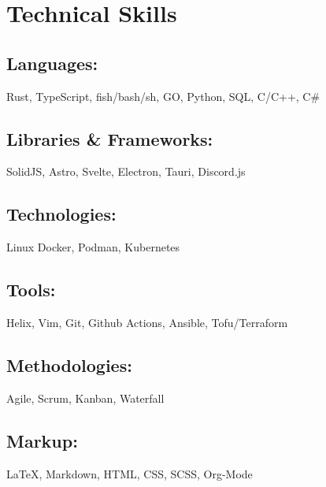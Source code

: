 \section{Technical Skills}

\subsection{Languages:} Rust, TypeScript, fish/bash/sh, GO, Python, SQL, C/C++, C\#
\subsection{Libraries \& Frameworks:} SolidJS, Astro, Svelte, Electron, Tauri, Discord.js
\subsection{Technologies:} Linux Docker, Podman, Kubernetes
\subsection{Tools:} Helix, Vim, Git, Github Actions, Ansible, Tofu/Terraform
\subsection{Methodologies:} Agile, Scrum, Kanban, Waterfall
\subsection{Markup:} {\LaTeX}, Markdown, HTML, CSS, SCSS, Org-Mode
